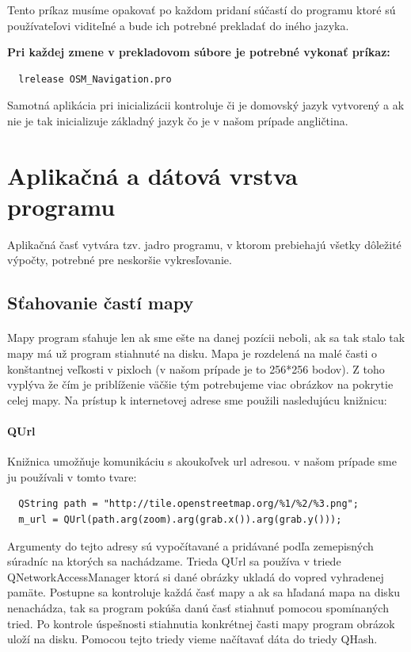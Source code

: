 Tento príkaz musíme opakovať po každom pridaní súčastí do programu ktoré sú používateľovi viditeľné a bude ich potrebné prekladať do iného jazyka.
\begin{flushleft}
\textbf{Pri každej zmene v prekladovom súbore je potrebné vykonať príkaz:}
\begin{verbatim}
  lrelease OSM_Navigation.pro
\end{verbatim} 
\end{flushleft}

Samotná aplikácia pri inicializácii kontroluje či je domovský jazyk vytvorený a ak nie je tak inicializuje základný jazyk čo je v našom prípade angličtina.

\section{Aplikačná a dátová vrstva programu}
Aplikačná časť vytvára tzv. jadro programu, v ktorom prebiehajú všetky dôležité výpočty, potrebné pre neskoršie vykresľovanie. 
\subsection{Sťahovanie častí mapy}
\paragraph{}
Mapy program sťahuje len ak sme ešte na danej pozícii neboli, ak sa tak stalo tak mapy má už program stiahnuté na disku. Mapa je rozdelená na malé časti o konštantnej veľkosti v pixloch (v našom prípade je to 256*256 bodov). Z toho vyplýva že čím je priblíženie väčšie tým potrebujeme viac obrázkov na pokrytie celej mapy. Na prístup k internetovej adrese sme použili nasledujúcu knižnicu:
\paragraph{QUrl}
Knižnica umožňuje komunikáciu s akoukoľvek url adresou. 
v našom prípade sme ju používali v tomto tvare:
\begin{verbatim}
  QString path = "http://tile.openstreetmap.org/%1/%2/%3.png";
  m_url = QUrl(path.arg(zoom).arg(grab.x()).arg(grab.y())); 
\end{verbatim}

Argumenty do tejto adresy sú vypočítavané a pridávané podľa zemepisných súradníc na ktorých sa nachádzame.
Trieda QUrl sa používa v triede QNetworkAccessManager ktorá si dané obrázky ukladá do vopred vyhradenej pamäte.
Postupne sa kontroluje každá časť mapy a ak sa hľadaná mapa na disku nenachádza, tak sa program pokúša danú časť stiahnuť pomocou spomínaných tried. Po kontrole úspešnosti stiahnutia konkrétnej časti mapy program obrázok uloží na disku. Pomocou tejto triedy vieme načítavať dáta do triedy QHash. 
